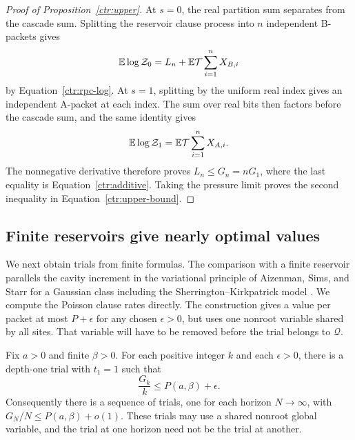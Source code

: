 \begin{proof}[Proof of Proposition~\ref{ctr:upper}]
At $s=0$, the real partition sum separates from the cascade sum.  Splitting
the reservoir clause process into $n$ independent B-packets gives
\[
 \mathbb E\log\mathcal Z_0
   =L_n+\mathbb E\mathcal T\sum_{i=1}^nX_{B,i}
\]
by Equation~\eqref{ctr:rpc-log}.  At $s=1$, splitting by the uniform real
index gives an independent A-packet at each index.  The sum over real bits
then factors before the cascade sum, and the same identity gives
\[
 \mathbb E\log\mathcal Z_1=\mathbb E\mathcal T\sum_{i=1}^nX_{A,i}.
\]
The nonnegative derivative therefore proves $L_n\le G_n=nG_1$, where the
last equality is Equation~\eqref{ctr:additive}.  Taking the pressure limit
proves the second inequality in Equation~\eqref{ctr:upper-bound}.
\end{proof}

\subsection{Finite reservoirs give nearly optimal values}

We next obtain trials from finite formulas.  The comparison with a finite
reservoir parallels the cavity increment in the variational principle of
Aizenman, Sims, and Starr for a Gaussian class including the
Sherrington--Kirkpatrick model
\cite[arXiv version, Lemma~3]{AizenmanSimsStarr2003}.  We compute the
Poisson clause rates directly.
The construction gives a value per packet at most $P+\epsilon$ for any
chosen $\epsilon>0$, but uses one nonroot variable shared by all sites.
That variable will have to be removed before the trial belongs to
$\mathcal Q$.

\begin{lemma}
\label{ctr:reservoir}
Fix $a>0$ and finite $\beta>0$.  For each positive integer $k$ and each
$\epsilon>0$, there is a depth-one trial with $t_1=1$ such that
\begin{equation}
 \frac{G_k}{k}\le P(a,\beta)+\epsilon.
 \label{ctr:reservoir-bound}
\end{equation}
Consequently there is a sequence of trials, one for each horizon
$N\to\infty$, with $G_N/N\le P(a,\beta)+o(1)$.  These trials may use a
shared nonroot global variable, and the trial at one horizon need not be
the trial at another.
\end{lemma}

